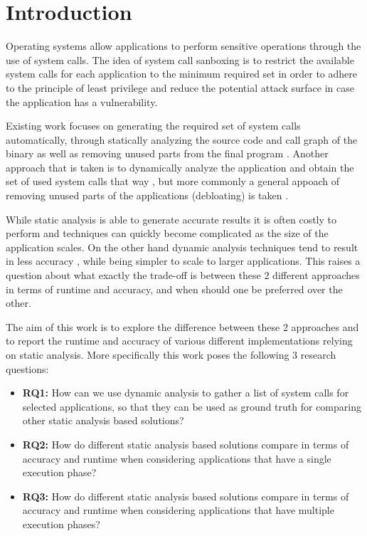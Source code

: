 \section{Introduction}
Operating systems allow applications to perform sensitive operations through the use of system calls. The idea of system call sanboxing is to restrict the available system calls for each application to the minimum required set in order to adhere to the principle of least privilege and reduce the potential attack surface in case the application has a vulnerability.

Existing work focuses on generating the required set of system calls automatically, through statically analyzing the source code and call graph of the binary as well as removing unused parts from the final program \cite{ref_sp_1}  \cite{ref_sp_3} \cite{ref_sp_2} \cite{ref_mp_1}.
Another approach that is taken is to dynamically analyze the application and obtain the set of used system calls that way \cite{ref_dyn_1}, but more commonly a general appoach of removing unused parts of the applications (debloating) is taken \cite{ref_debloat_1} \cite{ref_debloat_2}. %

While static analysis is able to generate accurate results it is often costly to perform \cite{ref_sp_1} and techniques can quickly become complicated as the size of the application scales.
On the other hand dynamic analysis techniques tend to result in less accuracy \cite{ref_sp_3}, while being simpler to scale to larger applications.
This raises a question about what exactly the trade-off is between these 2 different approaches in terms of runtime and accuracy, and when should one be preferred over the other.

The aim of this work is to explore the difference between these 2 approaches and to report the runtime and accuracy of various different implementations relying on static analysis.
More specifically this work poses the following 3 research questions:
\begin{itemize}
    \item{\textbf{RQ1:} How can we use dynamic analysis to gather a list of system calls for selected applications, so that they can be used as ground truth for comparing other static analysis based solutions?}
    \item{\textbf{RQ2:} How do different static analysis based solutions compare in terms of accuracy and runtime when considering applications that have a single execution phase?}
    \item{\textbf{RQ3:} How do different static analysis based solutions compare in terms of accuracy and runtime when considering applications that have multiple execution phases?}
\end{itemize}

